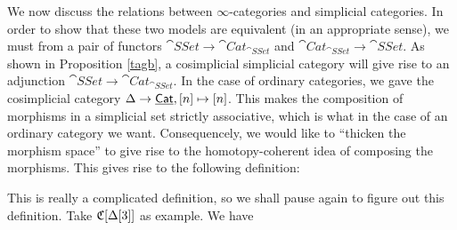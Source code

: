 We now discuss the relations between $\infty$-categories and simplicial categories. In order to show that these two models are equivalent
(in an appropriate sense), we must from a pair of functors $\cat{SSet}\to\cat{Cat}_{\cat{SSet}}$ and $\cat{Cat}_{\cat{SSet}}\to\cat{SSet}$.
As shown in Proposition \ref{tagb}, a cosimplicial simplicial category will give rise to an adjunction $\cat{SSet}\to\cat{Cat}_{\cat{SSet}}$.
In the case of ordinary categories, we gave the cosimplicial category $\Delta\to\underline{\smash{\mathsf{Cat}}},[n]\mapsto[n]$. This makes the composition of morphisms
in a simplicial set strictly associative, which is what in the case of an ordinary category we want. Consequencely, we would like
to ``thicken the morphism space'' to give rise to the homotopy-coherent idea of composing the morphisms. This gives rise to
the following definition:


This is really a complicated definition, so we shall pause again to figure out this definition. Take $\mathfrak{C}[\Delta[3]]$ as example. We have